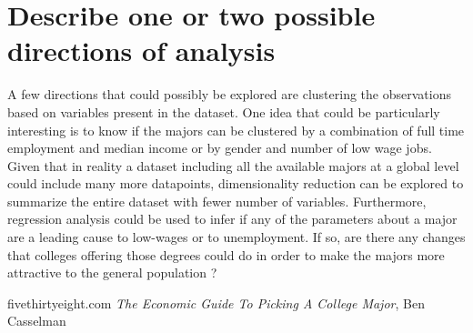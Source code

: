 \documentclass[11pt,a4paper]{article}
\begin{document}
\section*{Describe one or two possible directions of analysis}
A few directions that could possibly be explored are clustering the observations based on variables present in the dataset. One idea that could be particularly interesting is to know if the majors can be clustered by a combination of full time employment and median income or by gender and number of low wage jobs. Given that in reality a dataset including all the available majors at a global level could include many more datapoints, dimensionality reduction can be explored to summarize the entire dataset with fewer number of variables. Furthermore, regression analysis could be used to infer if any of the parameters about a major are a leading cause to low-wages or to unemployment. If so, are there any changes that colleges offering those degrees could do in order to make the majors more attractive to the general population ?

\begin{thebibliography}{9}
fivethirtyeight.com \emph{The Economic Guide To Picking A College Major}, Ben Casselman
\end{thebibliography}
\end{document}
